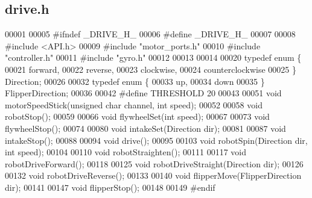 \subsection{drive.\+h}
\label{drive_8h_source}

\begin{DoxyCode}
00001 
00005 \textcolor{preprocessor}{ #ifndef \_DRIVE\_H\_}
00006 \textcolor{preprocessor}{ #define \_DRIVE\_H\_}
00007 
00008 \textcolor{preprocessor}{ #include <API.h>}
00009 \textcolor{preprocessor}{ #include "motor_ports.h"}
00010 \textcolor{preprocessor}{ #include "controller.h"}
00011 \textcolor{preprocessor}{ #include "gyro.h"}
00012 
00013 
00014 
00020 \textcolor{keyword}{typedef} \textcolor{keyword}{enum} \{
00021   forward,
00022   reverse,
00023   clockwise,
00024   counterclockwise
00025 \} Direction;
00026 
00032 \textcolor{keyword}{typedef} \textcolor{keyword}{enum} \{
00033   up,
00034   down
00035 \} FlipperDirection;
00036 
00042 \textcolor{preprocessor}{#define THRESHOLD 20}
00043 
00051 \textcolor{keywordtype}{void} motorSpeedStick(\textcolor{keywordtype}{unsigned} \textcolor{keywordtype}{char} channel, \textcolor{keywordtype}{int} speed);
00052 
00058 \textcolor{keywordtype}{void} robotStop();
00059 
00066 \textcolor{keywordtype}{void} flywheelSet(\textcolor{keywordtype}{int} speed);
00067 
00073 \textcolor{keywordtype}{void} flywheelStop();
00074 
00080 \textcolor{keywordtype}{void} intakeSet(Direction dir);
00081 
00087 \textcolor{keywordtype}{void} intakeStop();
00088 
00094 \textcolor{keywordtype}{void} drive();
00095 
00103 \textcolor{keywordtype}{void} robotSpin(Direction dir, \textcolor{keywordtype}{int} speed);
00104 
00110 \textcolor{keywordtype}{void} robotStraighten();
00111 
00117 \textcolor{keywordtype}{void} robotDriveForward();
00118 
00125 \textcolor{keywordtype}{void} robotDriveStraight(Direction dir);
00126 
00132 \textcolor{keywordtype}{void} robotDriveReverse();
00133 
00140 \textcolor{keywordtype}{void} flipperMove(FlipperDirection dir);
00141 
00147 \textcolor{keywordtype}{void} flipperStop();
00148 
00149 \textcolor{preprocessor}{#endif}
\end{DoxyCode}

